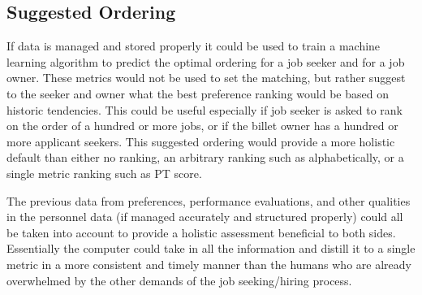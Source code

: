 \subsection{Suggested Ordering}

If data is managed and stored properly it could be used to train a machine learning algorithm to predict the optimal ordering for a job seeker and for a job owner. These metrics would not be used to set the matching, but rather suggest to the seeker and owner what the best preference ranking would be based on historic tendencies. This could be useful especially if job seeker is asked to rank on the order of a hundred or more jobs, or if the billet owner has a hundred or more applicant seekers. This suggested ordering would provide a more holistic default than either no ranking, an arbitrary ranking such as alphabetically, or a single metric ranking such as PT score.

The previous data from preferences, performance evaluations, and other qualities in the personnel data (if managed accurately and structured properly) could all be taken into account to provide a holistic assessment beneficial to both sides. Essentially the computer could take in all the information and distill it to a single metric in a more consistent and timely manner than the humans who are already overwhelmed by the other demands of the job seeking/hiring process.